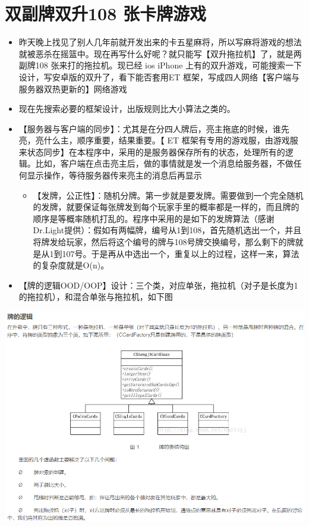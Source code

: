 \documentclass[9pt, b5paper]{article}
\begin{document}
\section{双副牌双升108 张卡牌游戏}
\label{sec:orgdf94c31}
\begin{itemize}
\item 昨天晚上找见了别人几年前就开发出来的卡五星麻将，所以写麻将游戏的想法就被恶杀在摇篮中。现在再写什么好呢？就只能写【双升拖拉机】了，就是两副牌108 张来打的拖拉机。现已经 ios iPhone 上有的双升游戏，可能搜索一下设计，写安卓版的双升了，看下能否套用ET 框架，写成四人网络【客户端与服务器双热更新的】网络游戏
\item 现在先搜索必要的框架设计，出版规则比大小算法之类的。
\item 【服务器与客户端的同步】：尤其是在分四人牌后，亮主拖底的时候，谁先亮，亮什么主，顺序重要，结果重要。【 ET 框架有专用的游戏服，由游戏服来状态同步】在本程序中，采用的是服务器保存所有的状态，处理所有的逻辑。比如，客户端在点击亮主后，做的事情就是发一个消息给服务器，不做任何显示操作，等待服务器传来亮主的消息后再显示
\begin{itemize}
\item 【发牌，公正性】：随机分牌。第一步就是要发牌。需要做到一个完全随机的发牌，就要保证每张牌发到每个玩家手里的概率都是一样的，而且牌的顺序是等概率随机打乱的。程序中采用的是如下的发牌算法（感谢Dr.Light提供）：假如有两幅牌，编号从1到108，首先随机选出一个，并且将牌发给玩家，然后将这个编号的牌与108号牌交换编号，那么剩下的牌就是从1到107号。于是再从中选出一个，重复以上的过程，这样一来，算法的复杂度就是O(n)。
\end{itemize}
\item 【牌的逻辑OOD/OOP】设计：三个类，对应单张，拖拉机（对子是长度为1 的拖拉机），和混合单张与拖拉机，如下图
\end{itemize}

\begin{center}
\includegraphics[width=.9\linewidth]{./pic/plan_20230508_213616.png}
\end{center}
\end{document}
